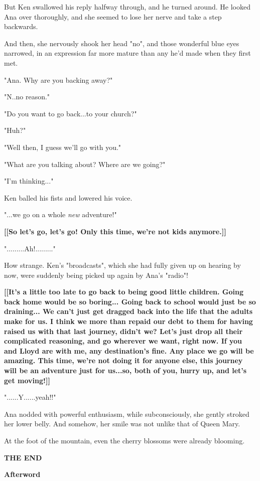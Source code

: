 \documentclass[
]{article}
\begin{document}
But Ken swallowed his reply halfway through, and he turned around. He
looked Ana over thoroughly, and she seemed to lose her nerve and take a
step backwards.

And then, she nervously shook her head "no", and those wonderful blue
eyes narrowed, in an expression far more mature than any he'd made when
they first met.

"Ana. Why are you backing away?"

"N..no reason."

"Do you want to go back...to your church?"

"Huh?"

"Well then, I guess we'll go with you."

"What are you talking about? Where are we going?"

"I'm thinking..."

Ken balled his fists and lowered his voice.

"...we go on a whole \emph{new} adventure!"

\textbf{{[}{[}So let's go, let's go! Only this time, we're not kids
anymore.{]}{]}}

".........Ah!........."

How strange. Ken's "broadcasts", which she had fully given up on hearing
by now, were suddenly being picked up again by Ana's "radio"!

\textbf{{[}{[}It's a little too late to go back to being good little
children. Going back home would be so boring... Going back to school
would just be so draining... We can't just get dragged back into the
life that the adults make for us. I think we more than repaid our debt
to them for having raised us with that last journey, didn't we? Let's
just drop all their complicated reasoning, and go wherever we want,
right now. If you and Lloyd are with me, any destination's fine. Any
place we go will be amazing. This time, we're not doing it for anyone
else, this journey will be an adventure just for us...so, both of you,
hurry up, and let's get moving!{]}{]}}

"......Y......yeah!!"

Ana nodded with powerful enthusiasm, while subconsciously, she gently
stroked her lower belly. And somehow, her smile was not unlike that of
Queen Mary.

At the foot of the mountain, even the cherry blossoms were already
blooming.

\textbf{THE END}

\textbf{Afterword}
\end{document}
